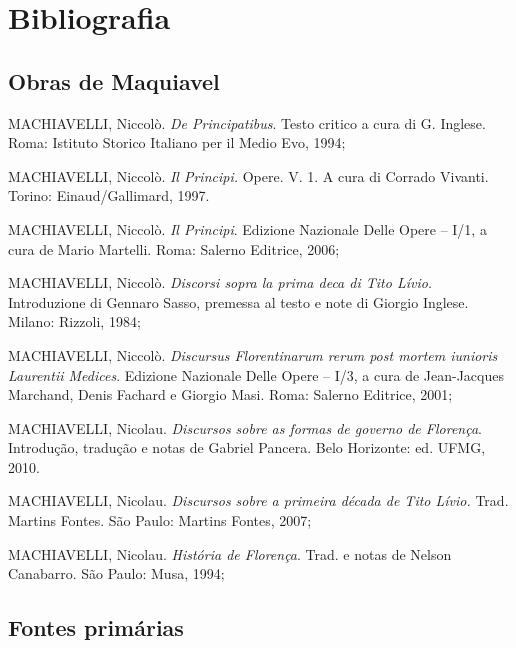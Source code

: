 \chapter*{Bibliografia}

\section*{Obras de Maquiavel}

\begin{Parskip}
MACHIAVELLI, Niccolò. \emph{De Principatibus}. Testo critico a cura di
G. Inglese. Roma: Istituto Storico Italiano per il Medio Evo, 1994;

MACHIAVELLI, Niccolò. \emph{Il Principi.} Opere. V. 1. A cura di Corrado
Vivanti. Torino: Einaud/Gallimard, 1997.

MACHIAVELLI, Niccolò. \emph{Il Principi}. Edizione Nazionale Delle Opere
-- I/1, a cura de Mario Martelli. Roma: Salerno Editrice, 2006;

MACHIAVELLI, Niccolò. \emph{Discorsi sopra la prima deca di Tito Lívio.}
Introduzione di Gennaro Sasso, premessa al testo e note di Giorgio
Inglese. Milano: Rizzoli, 1984;

MACHIAVELLI, Niccolò. \emph{Discursus Florentinarum rerum post mortem
iunioris Laurentii Medices}. Edizione Nazionale Delle Opere -- I/3, a
cura de Jean-Jacques Marchand, Denis Fachard e Giorgio Masi. Roma:
Salerno Editrice, 2001;

MACHIAVELLI, Nicolau. \emph{Discursos sobre as formas de governo de
Florença}. Introdução, tradução e notas de Gabriel Pancera. Belo
Horizonte: ed. UFMG, 2010.

MACHIAVELLI, Nicolau. \emph{Discursos sobre a primeira década de Tito
Lívio.} Trad. Martins Fontes. São Paulo: Martins Fontes, 2007;

MACHIAVELLI, Nicolau. \emph{História de Florença}. Trad. e notas de
Nelson Canabarro. São Paulo: Musa, 1994;
\end{Parskip}

\section*{Fontes primárias}

